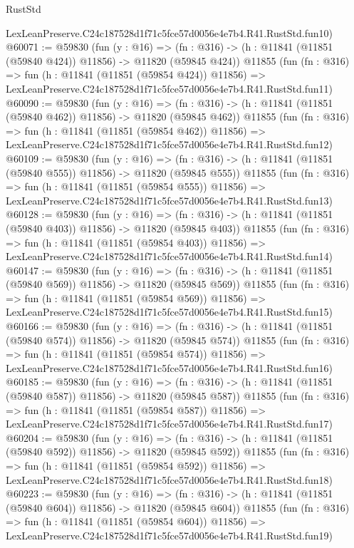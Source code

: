 \begin{lexlean}{RustStd}
\begin{coremodule}
    LexLeanPreserve.C24c187528d1f71c5fce57d0056e4e7b4.R41.RustStd.fun10)
@60071 := @59830
    (fun (y : @16) =>
    (fn : @316) -> (h : @11841 (@11851 (@59840 @424)) @11856) -> @11820 (@59845 @424))
    @11855
    (fun (fn : @316) =>
    fun (h : @11841 (@11851 (@59854 @424)) @11856) =>
    LexLeanPreserve.C24c187528d1f71c5fce57d0056e4e7b4.R41.RustStd.fun11)
@60090 := @59830
    (fun (y : @16) =>
    (fn : @316) -> (h : @11841 (@11851 (@59840 @462)) @11856) -> @11820 (@59845 @462))
    @11855
    (fun (fn : @316) =>
    fun (h : @11841 (@11851 (@59854 @462)) @11856) =>
    LexLeanPreserve.C24c187528d1f71c5fce57d0056e4e7b4.R41.RustStd.fun12)
@60109 := @59830
    (fun (y : @16) =>
    (fn : @316) -> (h : @11841 (@11851 (@59840 @555)) @11856) -> @11820 (@59845 @555))
    @11855
    (fun (fn : @316) =>
    fun (h : @11841 (@11851 (@59854 @555)) @11856) =>
    LexLeanPreserve.C24c187528d1f71c5fce57d0056e4e7b4.R41.RustStd.fun13)
@60128 := @59830
    (fun (y : @16) =>
    (fn : @316) -> (h : @11841 (@11851 (@59840 @403)) @11856) -> @11820 (@59845 @403))
    @11855
    (fun (fn : @316) =>
    fun (h : @11841 (@11851 (@59854 @403)) @11856) =>
    LexLeanPreserve.C24c187528d1f71c5fce57d0056e4e7b4.R41.RustStd.fun14)
@60147 := @59830
    (fun (y : @16) =>
    (fn : @316) -> (h : @11841 (@11851 (@59840 @569)) @11856) -> @11820 (@59845 @569))
    @11855
    (fun (fn : @316) =>
    fun (h : @11841 (@11851 (@59854 @569)) @11856) =>
    LexLeanPreserve.C24c187528d1f71c5fce57d0056e4e7b4.R41.RustStd.fun15)
@60166 := @59830
    (fun (y : @16) =>
    (fn : @316) -> (h : @11841 (@11851 (@59840 @574)) @11856) -> @11820 (@59845 @574))
    @11855
    (fun (fn : @316) =>
    fun (h : @11841 (@11851 (@59854 @574)) @11856) =>
    LexLeanPreserve.C24c187528d1f71c5fce57d0056e4e7b4.R41.RustStd.fun16)
@60185 := @59830
    (fun (y : @16) =>
    (fn : @316) -> (h : @11841 (@11851 (@59840 @587)) @11856) -> @11820 (@59845 @587))
    @11855
    (fun (fn : @316) =>
    fun (h : @11841 (@11851 (@59854 @587)) @11856) =>
    LexLeanPreserve.C24c187528d1f71c5fce57d0056e4e7b4.R41.RustStd.fun17)
@60204 := @59830
    (fun (y : @16) =>
    (fn : @316) -> (h : @11841 (@11851 (@59840 @592)) @11856) -> @11820 (@59845 @592))
    @11855
    (fun (fn : @316) =>
    fun (h : @11841 (@11851 (@59854 @592)) @11856) =>
    LexLeanPreserve.C24c187528d1f71c5fce57d0056e4e7b4.R41.RustStd.fun18)
@60223 := @59830
    (fun (y : @16) =>
    (fn : @316) -> (h : @11841 (@11851 (@59840 @604)) @11856) -> @11820 (@59845 @604))
    @11855
    (fun (fn : @316) =>
    fun (h : @11841 (@11851 (@59854 @604)) @11856) =>
    LexLeanPreserve.C24c187528d1f71c5fce57d0056e4e7b4.R41.RustStd.fun19)

\end{coremodule}
\end{lexlean}
